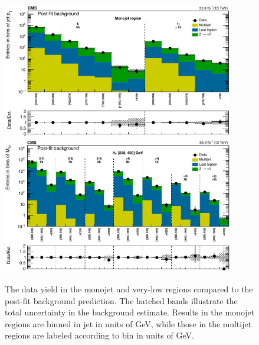 \begin{figure}
	\centering
	\includegraphics[width=0.90\textwidth]{results/figs/postfit/mt2_monojet_fullEstimate}
	\includegraphics[width=0.90\textwidth]{results/figs/postfit/mt2_veryLowHT_fullEstimate}
	\renewcommand{\baselinestretch}{1.0}
	\caption[The data yield in the monojet and very-low \HT regions compared to the post-fit background prediction.]{The data yield in the monojet and very-low \HT regions compared to the post-fit background prediction. The hatched bands illustrate the total uncertainty in the background estimate. Results in the monojet regions are binned in jet \pt in units of GeV, while those in the multijet regions are labeled according to \mttwo bin in units of GeV.}
	\label{fig:yieldPostfit1}
\end{figure}
